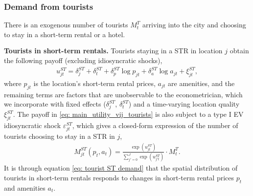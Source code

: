 \documentclass[11pt]{article}
\newcommand{\Paragraph}{\vspace{0.1cm}\noindent\textbf}
\begin{document}
\subsubsection{Demand from tourists}\label{sec:demand_tourists}

There is an exogenous number of tourists $M_t^T$ arriving into the city and choosing to stay in a short-term rental or a hotel.

\Paragraph{Tourists in short-term rentals.} Tourists staying in a STR in location $j$ obtain the following payoff (excluding idiosyncratic shocks),
\begin{align}\label{eq: main_utility_vij_tourists}
 u_{jt}^{ST} =  \delta_{j}^{ST} + \delta^{ST}_t  + \delta_{p}^{ST} \log p_{{j}t} + \delta_{a}^{ST} \log a_{jt} + \xi_{{j}t}^{ST},
\end{align}
where $p_{jt}$ is the location's short-term rental prices, $a_{jt}$ are amenities, and the remaining terms are factors that are unobservable to the econometrician, which we incorporate with fixed effects ($\delta_j^{ST}$, $\delta_t^{ST}$) and a time-varying location quality $\xi^{ST}_{jt}$. The payoff in \ref{eq: main_utility_vij_tourists} is also subject to a type I EV idiosyncratic shock $\varepsilon^{ST}_{jt}$, which gives a closed-form expression of the number of tourists choosing to stay in a STR in $j$, 
\begin{align}\label{eq: tourist ST demand}
M^{ST}_{jt}(p_t, a_t) = \frac{\exp \left( u_{jt}^{ST} \right) }{\sum_{j'=0}^J \exp \left( u_{j't}^{ST} \right) }\cdot M^{T}_t.
\end{align}
It is through equation \eqref{eq: tourist ST demand} that the spatial distribution of tourists in short-term rentals responds to changes in short-term rental prices $p_t$ and amenities $a_t$.
\end{document}
